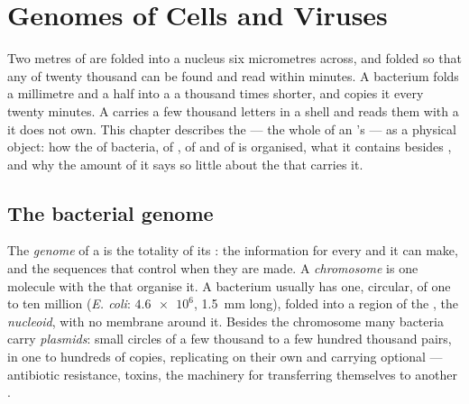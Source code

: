 \chapter{Genomes of Cells and Viruses}\label{ch:b1:genomes}

Two metres of  are folded into a nucleus six micrometres across,
and folded so that any of twenty thousand  can be found and read
within minutes. A bacterium folds a millimetre and a half into a 
a thousand times shorter, and copies it every twenty minutes. A 
carries a few thousand letters in a  shell and reads them with
a  it does not own. This chapter describes the \emph{} ---
the whole of an 's  --- as a physical object: how the  of
bacteria, of , of  and of  is
organised, what it contains besides , and why the amount of it
says so little about the  that carries it.

\section{The bacterial genome}

\begin{definition}\label{def:b1:genomes:genome}
The \emph{genome} of a  is the totality of its :
the information for every  and  it can make, and the
sequences that control when they are made. A \emph{chromosome}
is one  molecule with the  that organise it. A bacterium
usually has one, circular, of one to ten million 
(\emph{E. coli}: $\num{4.6e6}$, \qty{1.5}{mm} long), folded into a
region of the , the \emph{nucleoid}, with no
membrane around it. Besides the chromosome many bacteria carry
\emph{plasmids}: small circles of a few thousand to a
few hundred thousand pairs, in one to hundreds of copies, replicating
on their own and carrying optional  --- antibiotic resistance,
toxins, the machinery for transferring themselves to another .
\end{definition}


